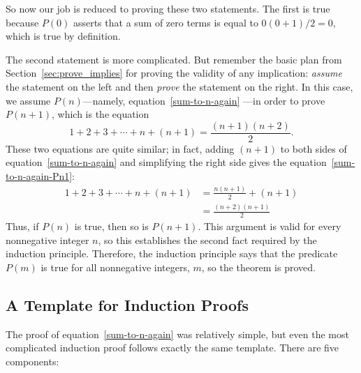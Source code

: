 So now our job is reduced to proving these two statements.  The first
is true because $P(0)$ asserts that a sum of zero terms is equal to
$0(0+1)/2 = 0$, which is true by definition.

The second statement is more complicated.  But remember the basic
plan from Section~\ref{sec:prove_implies} for proving the validity of
any implication: \emph{assume} the statement on the left and then
\emph{prove} the statement on the right.  In this case, we assume
$P(n)$---namely, equation~\eqref{sum-to-n-again} ---in order to prove
$P(n+1)$, which is the equation
\begin{equation}\label{sum-to-n-again-Pn1}
1 + 2 + 3 + \cdots + n + (n+1) = \frac{(n+1)(n+2)}{2}.
\end{equation}
These two equations are quite similar; in fact, adding $(n+1)$ to both
sides of equation~\eqref{sum-to-n-again} and simplifying the right side 
gives the equation~\eqref{sum-to-n-again-Pn1}:
\begin{align*}
1 + 2 + 3 + \cdots + n + (n+1)
    & = \frac{n(n+1)}{2} + (n+1) \\
    & = \frac{(n+2)(n+1)}{2}
\end{align*}
Thus, if $P(n)$ is true, then so is $P(n+1)$.  This argument is valid for
every nonnegative integer $n$, so this establishes the second fact
required by the induction principle.  Therefore, the induction principle
says that the predicate $P(m)$ is true for all nonnegative integers, $m$,
so the theorem is proved.

\iffalse
In effect, we've just proved
that $P(0)$ implies $P(1)$, $P(1)$ implies $P(2)$, $P(2)$ implies
$P(3)$, etc., all in one fell swoop.
\fi

\subsection{A Template for Induction Proofs}
\label{templ-induct-proofs}

The proof of equation~\eqref{sum-to-n-again} was relatively simple,
but even the most complicated induction proof follows exactly the same
template.  There are five components:

